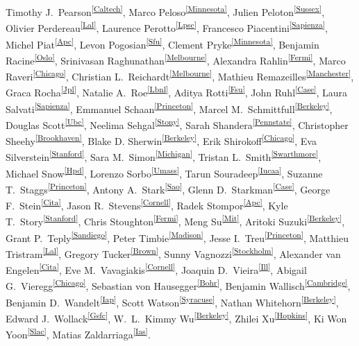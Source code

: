 Timothy J.~Pearson\textsuperscript{\ref{Caltech}},
Marco Peloso\textsuperscript{\ref{Minnesota}},
Julien Peloton\textsuperscript{\ref{Sussex}},
Olivier Perdereau\textsuperscript{\ref{Lal}},
Laurence Perotto\textsuperscript{\ref{Lpsc}},
Francesco Piacentini\textsuperscript{\ref{Sapienza}},
Michel Piat\textsuperscript{\ref{Apc}},
Levon Pogosian\textsuperscript{\ref{Sfu}},
Clement Pryke\textsuperscript{\ref{Minnesota}},
Benjamin Racine\textsuperscript{\ref{Oslo}},
Srinivasan Raghunathan\textsuperscript{\ref{Melbourne}},
Alexandra Rahlin\textsuperscript{\ref{Fermi}},
Marco Raveri\textsuperscript{\ref{Chicago}},
Christian L.~Reichardt\textsuperscript{\ref{Melbourne}},
Mathieu Remazeilles\textsuperscript{\ref{Manchester}},
Graca Rocha\textsuperscript{\ref{Jpl}},
Natalie A.~Roe\textsuperscript{\ref{Lbnl}},
Aditya Rotti\textsuperscript{\ref{Fsu}},
John Ruhl\textsuperscript{\ref{Case}},
Laura Salvati\textsuperscript{\ref{Sapienza}},
Emmanuel Schaan\textsuperscript{\ref{Princeton}},
Marcel M.~Schmittfull\textsuperscript{\ref{Berkeley}},
Douglas Scott\textsuperscript{\ref{Ubc}},
Neelima Sehgal\textsuperscript{\ref{Stony}},
Sarah Shandera\textsuperscript{\ref{Pennstate}},
Christopher Sheehy\textsuperscript{\ref{Brookhaven}},
Blake D. Sherwin\textsuperscript{\ref{Berkeley}},
Erik Shirokoff\textsuperscript{\ref{Chicago}},
Eva Silverstein\textsuperscript{\ref{Stanford}},
Sara M.~Simon\textsuperscript{\ref{Michigan}},
Tristan L.~Smith\textsuperscript{\ref{Swarthmore}},
Michael Snow\textsuperscript{\ref{Hpd}},
Lorenzo Sorbo\textsuperscript{\ref{Umass}},
Tarun Souradeep\textsuperscript{\ref{Iucaa}},
Suzanne T.~Staggs\textsuperscript{\ref{Princeton}},
Antony A.~Stark\textsuperscript{\ref{Sao}},
Glenn D.~Starkman\textsuperscript{\ref{Case}},
George F.~Stein\textsuperscript{\ref{Cita}},
Jason R.~Stevens\textsuperscript{\ref{Cornell}},
Radek Stompor\textsuperscript{\ref{Apc}},
Kyle T.~Story\textsuperscript{\ref{Stanford}},
Chris Stoughton\textsuperscript{\ref{Fermi}},
Meng Su\textsuperscript{\ref{Mit}},
Aritoki Suzuki\textsuperscript{\ref{Berkeley}},
Grant P.~Teply\textsuperscript{\ref{Sandiego}},
Peter Timbie\textsuperscript{\ref{Madison}},
Jesse I.~Treu\textsuperscript{\ref{Princeton}},
Matthieu Tristram\textsuperscript{\ref{Lal}},
Gregory Tucker\textsuperscript{\ref{Brown}},
Sunny Vagnozzi\textsuperscript{\ref{Stockholm}},
Alexander van Engelen\textsuperscript{\ref{Cita}},
Eve M.~Vavagiakis\textsuperscript{\ref{Cornell}},
Joaquin D.~Vieira\textsuperscript{\ref{Ill}},
Abigail G.~Vieregg\textsuperscript{\ref{Chicago}}, 
Sebastian von Hausegger\textsuperscript{\ref{Bohr}},
Benjamin Wallisch\textsuperscript{\ref{Cambridge}},
Benjamin D.~Wandelt\textsuperscript{\ref{Iap}},
Scott Watson\textsuperscript{\ref{Syracuse}},
Nathan Whitehorn\textsuperscript{\ref{Berkeley}},
Edward J.~Wollack\textsuperscript{\ref{Gsfc}},
W.~L.~Kimmy Wu\textsuperscript{\ref{Berkeley}},
Zhilei Xu\textsuperscript{\ref{Hopkins}},
Ki Won Yoon\textsuperscript{\ref{Slac}},
Matias Zaldarriaga\textsuperscript{\ref{Ias}}.

